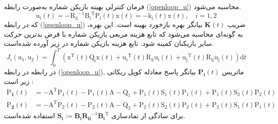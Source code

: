 فرمان کنترلی بهینه  بازیکن شماره  به‌صورت رابطه
(\ref{openloop_u})
محاسبه می‌شود.
\begin{equation}\label{openloop_u}
	\boldsymbol{\mathrm{u_i}}(t) = -\boldsymbol{\mathrm{R_{ii}}}^{-1}\boldsymbol{\mathrm{B_i}}^\mathrm{T}\boldsymbol{\mathrm{P_{i}}}(t)\boldsymbol{\mathrm{x}}(t) = -\boldsymbol{\mathrm{k_{i}}}(t)\boldsymbol{\mathrm{x}}(t),\quad i = 1, 2
\end{equation}
که در رابطه 
(\ref{openloop_u})
،ضریب  $\boldsymbol{K}(t)$ بیانگر بهره بازخورد بهینه است. این بهره به گونه‌ای محاسبه می‌شود که تابع هزینه مربعی بازیکن شماره  با فرض بدترین حرکت سایر بازیکنان کمینه شود. تابع هزینه بازیکن شماره  در زیر آورده شده‌است.
 \begin{equation}\label{cost}
	J_i( \boldsymbol{\mathrm{u_1}},  \boldsymbol{\mathrm{u_2}}) = \int_{0}^{T}\left( \boldsymbol{\mathrm{x}} ^\mathrm{T}(t) \boldsymbol{\mathrm{Q_i}} \boldsymbol{\mathrm{x}}(t)+
	\boldsymbol{\mathrm{u_i}} ^\mathrm{T}(t) \boldsymbol{\mathrm{R_{ii}}} \boldsymbol{\mathrm{u_i}}(t)+
	\boldsymbol{\mathrm{u_j}} ^\mathrm{T}(t)\boldsymbol{\mathrm{ R_{ij} u_j}}(t)
	\right)\mathrm{d}t
\end{equation}
در رابطه
در رابطه 
(\ref{openloop_u}),
ماتریس $\boldsymbol{P_{i}}(t)$ بیانگر پاسخ معادله کوپل ریكاتی
 زیر است
 \cite{diff_game}:
\begin{equation}\label{coupled_riccatti_LQDG}
\begin{split}
	\boldsymbol{\dot{\mathrm{P}}_1}(t) &= -\boldsymbol{\mathrm{A}}^\mathrm{T}\boldsymbol{\mathrm{P_1}}(t) - \boldsymbol{\mathrm{P_1}}(t)\boldsymbol{\mathrm{A}} - \boldsymbol{\mathrm{Q_1}} +\boldsymbol{\mathrm{P_1}}(t)\boldsymbol{\mathrm{S_1}}(t)\boldsymbol{\mathrm{P_1}}(t) + \boldsymbol{\mathrm{P_1}}(t)\boldsymbol{\mathrm{S_2}}(t)\boldsymbol{\mathrm{P_2}}(t)\\
	\boldsymbol{\dot{\mathrm{P}}_2}(t) &= -\boldsymbol{\mathrm{A}}^\mathrm{T}\boldsymbol{\mathrm{P_2}}(t) - \boldsymbol{\mathrm{P_2}}(t)\boldsymbol{\mathrm{A}} - \boldsymbol{\mathrm{Q_2}} +\boldsymbol{\mathrm{P_2}}(t)\boldsymbol{\mathrm{S_2}}(t)\boldsymbol{\mathrm{P_2}}(t) + \boldsymbol{\mathrm{P_2}}(t)\boldsymbol{\mathrm{S_1}}(t)\boldsymbol{\mathrm{P_1}}(t)
\end{split}
\end{equation}
برای سادگی از نمادسازی
$\boldsymbol{S_i} := \boldsymbol{B_iR_{ii}}^{-1}\boldsymbol{B_i}^\mathrm{T}$
  استفاده شده‌است. 


